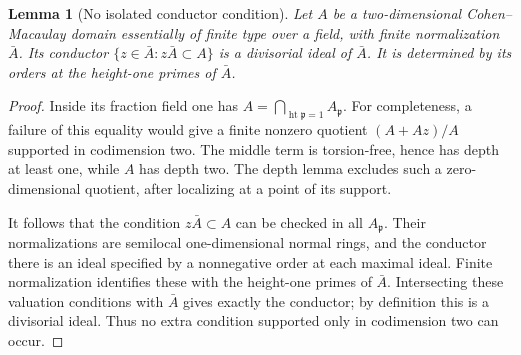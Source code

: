 \documentclass[11pt,reqno]{amsart}
\numberwithin{equation}{section}
\newtheorem{lemma}[theorem]{Lemma}
\theoremstyle{definition}\newtheorem{definition}[theorem]{Definition}
\theoremstyle{remark}\newtheorem{remark}[theorem]{Remark}
\begin{document}
\begin{lemma}[No isolated conductor condition]
\label{lem:conductor-depth-v170}
Let $A$ be a two-dimensional Cohen--Macaulay domain essentially of finite
type over a field, with finite normalization $\bar A$. Its conductor
$\{z\in\bar A:z\bar A\subset A\}$ is a divisorial ideal of $\bar A$.
It is determined by its orders at the height-one primes of $\bar A$.
\end{lemma}
\begin{proof}
Inside its fraction field one has
$A=\bigcap_{\operatorname{ht}\mathfrak p=1}A_{\mathfrak p}$.
For completeness, a failure of this equality would give a finite
nonzero quotient $(A+Az)/A$ supported in codimension two. The middle
term is torsion-free, hence has depth at least one, while $A$ has
depth two. The depth lemma excludes such a zero-dimensional quotient,
after localizing at a point of its support.

It follows that the condition $z\bar A\subset A$ can be checked
in all $A_{\mathfrak p}$. Their normalizations are semilocal
one-dimensional normal rings, and the conductor there is an ideal
specified by a nonnegative order at each maximal ideal. Finite
normalization identifies these with the height-one primes of
$\bar A$. Intersecting these valuation conditions with $\bar A$
gives exactly the conductor; by definition this is a divisorial
ideal. Thus no extra condition supported only in codimension two
can occur.
\end{proof}
\end{document}
